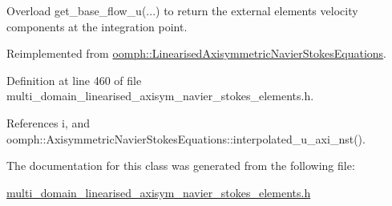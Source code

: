 Overload get\+\_\+base\+\_\+flow\+\_\+u(...) to return the external element\textquotesingle{}s velocity components at the integration point. 



Reimplemented from \hyperlink{classoomph_1_1LinearisedAxisymmetricNavierStokesEquations_a74c8399c96e4870f831dcc01986a72cd}{oomph\+::\+Linearised\+Axisymmetric\+Navier\+Stokes\+Equations}.



Definition at line 460 of file multi\+\_\+domain\+\_\+linearised\+\_\+axisym\+\_\+navier\+\_\+stokes\+\_\+elements.\+h.



References i, and oomph\+::\+Axisymmetric\+Navier\+Stokes\+Equations\+::interpolated\+\_\+u\+\_\+axi\+\_\+nst().



The documentation for this class was generated from the following file\+:\begin{DoxyCompactItemize}
\item 
\hyperlink{multi__domain__linearised__axisym__navier__stokes__elements_8h}{multi\+\_\+domain\+\_\+linearised\+\_\+axisym\+\_\+navier\+\_\+stokes\+\_\+elements.\+h}\end{DoxyCompactItemize}
